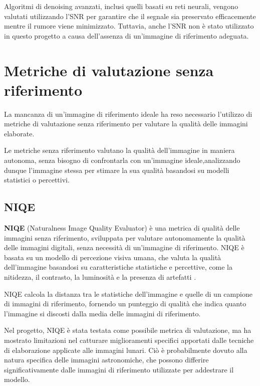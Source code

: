 Algoritmi di denoising avanzati, inclusi quelli basati su reti neurali, vengono valutati utilizzando l'SNR per garantire che il segnale sia preservato efficacemente mentre il rumore viene minimizzato. Tuttavia, anche l'SNR non è stato utilizzato in questo progetto a causa dell'assenza di un'immagine di riferimento adeguata.

\section{Metriche di valutazione senza riferimento} \label{sec:nr_metrics}

La mancanza di un'immagine di riferimento ideale ha reso necessario l'utilizzo di metriche di valutazione senza riferimento per valutare la qualità delle immagini elaborate.

Le metriche senza riferimento valutano la qualità dell'immagine in maniera autonoma, senza bisogno di confrontarla con un'immagine ideale,analizzando dunque l'immagine stessa per stimare la sua qualità basandosi su modelli statistici o percettivi.

\subsection{NIQE} \label{subsec:niqe}

\textbf{NIQE} (Naturalness Image Quality Evaluator) è una metrica di qualità delle immagini senza riferimento, sviluppata per valutare autonomamente la qualità delle immagini digitali, senza necessità di un'immagine di riferimento. NIQE è basata su un modello di percezione visiva umana, che valuta la qualità dell'immagine basandosi su caratteristiche statistiche e percettive, come la nitidezza, il contrasto, la luminosità e la presenza di artefatti \cite{niqe_paper}.

NIQE calcola la distanza tra le statistiche dell'immagine e quelle di un campione di immagini di riferimento, fornendo un punteggio di qualità che indica quanto l'immagine si discosti dalla media delle immagini di riferimento.

Nel progetto, NIQE è stata testata come possibile metrica di valutazione, ma ha mostrato limitazioni nel catturare miglioramenti specifici apportati dalle tecniche di elaborazione applicate alle immagini lunari. Ciò è probabilmente dovuto alla natura specifica delle immagini astronomiche, che possono differire significativamente dalle immagini di riferimento utilizzate per addestrare il modello.

